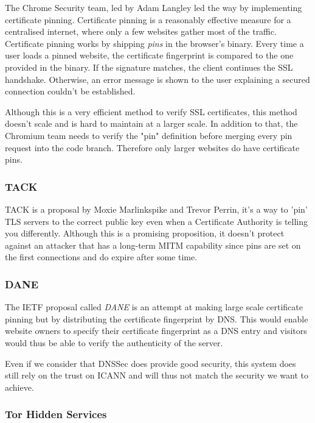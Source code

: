\documentclass{vldb}
\begin{document}
The Chrome Security team, led by Adam Langley led the way by implementing certificate pinning. Certificate pinning is a reasonably effective measure for a centralised internet, where only a few websites gather most of the traffic. Certificate pinning works by shipping \emph{pins} in the browser's binary.\cite{chromiumPins} Every time a user loads a pinned website, the certificate fingerprint is compared to the one provided in the binary. If the signature matches, the client continues the SSL handshake. Otherwise, an error message is shown to the user explaining a secured connection couldn't be established.

Although this is a very efficient method to verify SSL certificates, this method doesn't scale and is hard to maintain at a larger scale. In addition to that, the Chromium team needs to verify the "pin" definition before merging every pin request into the code branch. Therefore only larger websites do have certificate pins.

\subsubsection{TACK}

TACK is a proposal by Moxie Marlinkspike and Trevor Perrin, it's a way to 'pin' TLS servers to the correct public key even when a Certificate Authority is telling you differently. Although this is a promising proposition, it doesn't protect against an attacker that has a long-term MITM capability since pins are set on the first connections and do expire after some time.\cite{tackMITM}

\subsubsection{DANE}

The IETF proposal called \emph{DANE} is an attempt at making large scale certificate pinning but by distributing the certificate fingerprint by DNS. This would enable website owners to specify their certificate fingerprint as a DNS entry and visitors would thus be able to verify the authenticity of the server.

Even if we consider that DNSSec does provide good security, this system does still rely on the trust on ICANN and will thus not match the security we want to achieve.

\subsubsection{Tor Hidden Services}
\end{document}
